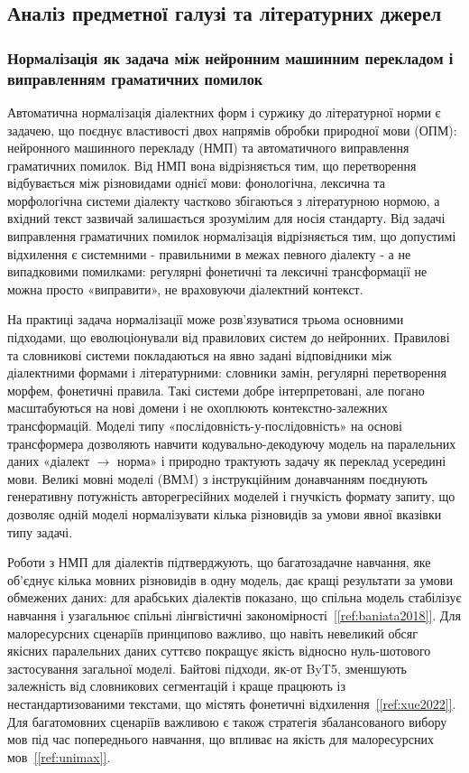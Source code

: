 \documentclass[14pt]{extarticle}
\newcommand{\citeref}[1]{\hyperref[#1]{[\ref*{#1}]}}
\begin{document}
\subsection{Аналіз предметної галузі та літературних джерел}

\subsubsection{Нормалізація як задача між нейронним машинним перекладом і виправленням граматичних помилок}

Автоматична нормалізація діалектних форм і суржику до літературної норми є задачею, що поєднує властивості двох напрямів обробки природної мови (ОПМ): нейронного машинного перекладу (НМП) та автоматичного виправлення граматичних помилок. Від НМП вона відрізняється тим, що перетворення відбувається між різновидами однієї мови: фонологічна, лексична та морфологічна системи діалекту частково збігаються з літературною нормою, а вхідний текст зазвичай залишається зрозумілим для носія стандарту. Від задачі виправлення граматичних помилок нормалізація відрізняється тим, що допустимі відхилення є системними - правильними в межах певного діалекту - а не випадковими помилками: регулярні фонетичні та лексичні трансформації не можна просто «виправити», не враховуючи діалектний контекст.

На практиці задача нормалізації може розв'язуватися трьома основними підходами, що еволюціонували від правилових систем до нейронних. Правилові та словникові системи покладаються на явно задані відповідники між діалектними формами і літературними: словники замін, регулярні перетворення морфем, фонетичні правила. Такі системи добре інтерпретовані, але погано масштабуються на нові домени і не охоплюють контекстно-залежних трансформацій. Моделі типу «послідовність-у-послідовність» на основі трансформера дозволяють навчити кодувально-декодуючу модель на паралельних даних «діалект $\to$ норма» і природно трактують задачу як переклад усередині мови. Великі мовні моделі (ВМM) з інструкційним донавчанням поєднують генеративну потужність авторегресійних моделей і гнучкість формату запиту, що дозволяє одній моделі нормалізувати кілька різновидів за умови явної вказівки типу задачі.

Роботи з НМП для діалектів підтверджують, що багатозадачне навчання, яке об'єднує кілька мовних різновидів в одну модель, дає кращі результати за умови обмежених даних: для арабських діалектів показано, що спільна модель стабілізує навчання і узагальнює спільні лінгвістичні закономірності~\citeref{ref:baniata2018}. Для малоресурсних сценаріїв принципово важливо, що навіть невеликий обсяг якісних паралельних даних суттєво покращує якість відносно нуль-шотового застосування загальної моделі. Байтові підходи, як-от ByT5, зменшують залежність від словникових сегментацій і краще працюють із нестандартизованими текстами, що містять фонетичні відхилення~\citeref{ref:xue2022}. Для багатомовних сценаріїв важливою є також стратегія збалансованого вибору мов під час попереднього навчання, що впливає на якість для малоресурсних мов~\citeref{ref:unimax}.
\end{document}
